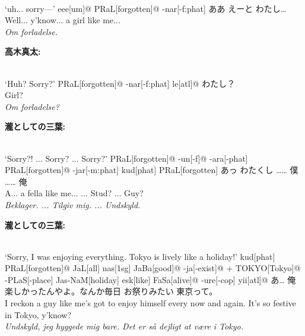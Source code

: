 \begin{paracol}{2}
\switchcolumn

\exdisplay[lingstyle=Conversation]
\begingl 
\glpreamble
\textbf{}\\
`uh... sorry---'
\endpreamble
eee[um]@
PRaL[forgotten]@
-nar[\sc -f:phat]
\glft
ああ えーと わたし…\\
Well... y'know... a girl like me...\\
\textit{Om forladelse.}
\endgl
\xe

\bigskip
\switchcolumn*
\hfill \textbf{高木真太:}

\switchcolumn

\exdisplay[lingstyle=Conversation]
\begingl 
\glpreamble
\textbf{}\\
`Huh? Sorry?'
\endpreamble
PRaL[forgotten]@
-nar[\sc -f:phat]
le[\sc atl]@
\glft
わたし？\\
Girl?\\
\textit{Om forladelse?}
\endgl
\xe

\bigskip
\switchcolumn*
\hfill \textbf{瀧としての三葉:}

\switchcolumn

\exdisplay[lingstyle=Conversation]
\begingl 
\glpreamble
\textbf{}\\
`Sorry?! ... Sorry? ... Sorry?'
\endpreamble
PRaL[forgotten]@
-un[\sc -f]@
-ara[\sc -phat]
PRaL[forgotten]@
-jar[\sc -m:phat]
kud[\sc phat]
PRaL[forgotten]
\glft
あっ わたくし …… 僕 …… 俺\\
A... a fella like me... ... Stud? ... Guy?\\
\textit{Beklager. ... Tilgiv mig. ... Undskyld.}
\endgl
\xe

\bigskip
\switchcolumn*
\hfill \textbf{瀧としての三葉:}

\switchcolumn

\exdisplay[lingstyle=Conversation]
\begingl 
\glpreamble
\textbf{}\\
`Sorry, I was enjoying everything. Tokyo is lively like a holiday!'
\endpreamble
kud[\sc phat]
PRaL[forgotten]@
\nogloss{,}
JaL[all]
nas[\sc 1sg]
JaBa[good]@
-ja[\sc -exist]@
+
\textrm{T}OKYO[Tokyo]@
-PLaS[-place]
Jas-NaM[holiday]
esk[like]
FaSa[alive]@
-ure[\sc -cop]
yii[\sc atl]@
\nogloss{!}
\glft
あ… 俺 楽しかったんやよ。なんか毎日 お祭りみたい 東京って。\\
I reckon a guy like me's got to enjoy himself every now and again. It's so festive in Tokyo, y'know?\\
\textit{Undskyld, jeg hyggede mig bare. Det er så dejligt at være i Tokyo.}
\endgl
\xe


\end{paracol}
